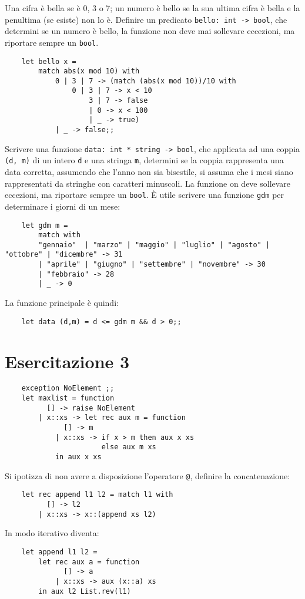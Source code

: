 \documentclass{article}
\numberwithin{equation}{subsection}
\begin{document}

Una cifra è bella se è 0, 3 o 7; un numero è bello se la sua ultima cifra è bella e la penultima (se esiste) non lo è. Definire un predicato \verb|bello: int -> bool|, che determini se un numero è bello, la funzione non deve mai sollevare eccezioni, ma riportare sempre un \verb|bool|. 
\begin{verbatim}
    let bello x = 
        match abs(x mod 10) with
            0 | 3 | 7 -> (match (abs(x mod 10))/10 with
                0 | 3 | 7 -> x < 10
                    3 | 7 -> false
                    | 0 -> x < 100
                    | _ -> true)
            | _ -> false;;
\end{verbatim}

Scrivere una funzione \verb|data: int * string -> bool|, che applicata ad una coppia \verb|(d, m)| di un intero \verb|d| e una stringa \verb|m|, determini se la coppia rappresenta una data corretta, assumendo che l'anno non sia bisestile, si assuma che i mesi siano rappresentati da stringhe con caratteri minuscoli. La funzione on deve sollevare eccezioni, ma riportare sempre un \verb|bool|. 
È utile scrivere una funzione \verb|gdm| per determinare i giorni di un mese:
\begin{verbatim}
    let gdm m = 
        match with
        "gennaio"  | "marzo" | "maggio" | "luglio" | "agosto" | "ottobre" | "dicembre" -> 31
        | "aprile" | "giugno" | "settembre" | "novembre" -> 30
        | "febbraio" -> 28
        | _ -> 0
\end{verbatim}
La funzione principale è quindi:
\begin{verbatim}
    let data (d,m) = d <= gdm m && d > 0;;
\end{verbatim}

\clearpage

\section{Esercitazione 3}

\begin{verbatim}
    exception NoElement ;; 
    let maxlist = function
          [] -> raise NoElement
        | x::xs -> let rec aux m = function
              [] -> m
            | x::xs -> if x > m then aux x xs
                       else aux m xs
            in aux x xs
\end{verbatim}

Si ipotizza di non avere a disposizione l'operatore \verb|@|, definire la concatenazione:
\begin{verbatim}
    let rec append l1 l2 = match l1 with
          [] -> l2
        | x::xs -> x::(append xs l2) 
\end{verbatim}
In modo iterativo diventa:
\begin{verbatim}
    let append l1 l2 =
        let rec aux a = function
              [] -> a
            | x::xs -> aux (x::a) xs
        in aux l2 List.rev(l1)
\end{verbatim}
\end{document}
